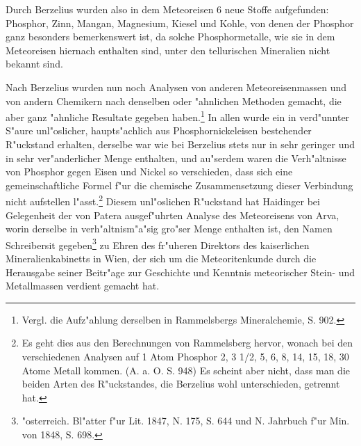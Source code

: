 \documentclass[a4paper, 11pt, oneside, german]{article}
\begin{document}
Durch Berzelius wurden also in dem Meteoreisen 6 neue Stoffe aufgefunden: Phosphor, Zinn, Mangan, Magnesium, Kiesel und Kohle, von denen der Phosphor ganz besonders bemerkenswert ist, da solche Phosphormetalle, wie sie in dem Meteoreisen hiernach enthalten sind, unter den tellurischen Mineralien nicht bekannt sind.

Nach Berzelius wurden nun noch Analysen von anderen Meteoreisenmassen und von andern Chemikern nach denselben oder "ahnlichen Methoden gemacht, die aber ganz "ahnliche Resultate gegeben haben.\footnote{Vergl. die Aufz"ahlung derselben in Rammelsbergs Mineralchemie, S. 902.} In allen wurde ein in verd"unnter S"aure unl"oslicher, haupts"achlich aus Phosphornickeleisen bestehender R"uckstand erhalten, derselbe war wie bei Berzelius stets nur in sehr geringer und in sehr ver"anderlicher Menge enthalten, und au"serdem waren die Verh"altnisse von Phosphor gegen Eisen und Nickel so verschieden, dass sich eine gemeinschaftliche Formel f"ur die chemische Zusammensetzung dieser Verbindung nicht aufstellen l"asst.\footnote{Es geht dies aus den Berechnungen von Rammelsberg hervor, wonach bei den verschiedenen Analysen auf 1 Atom Phosphor 2, 3 1/2, 5, 6, 8, 14, 15, 18, 30 Atome Metall kommen. (A. a. O. S. 948) Es scheint aber nicht, dass man die beiden Arten des R"uckstandes, die Berzelius wohl unterschieden, getrennt hat.} Diesem unl"oslichen R"uckstand hat Haidinger bei Gelegenheit der von Patera ausgef"uhrten Analyse des Meteoreisens von Arva, worin derselbe in verh"altnism"a"sig gro"ser Menge enthalten ist, den Namen Schreibersit gegeben\footnote{"osterreich. Bl"atter f"ur Lit. 1847, N. 175, S. 644 und N. Jahrbuch f"ur Min. von 1848, S. 698.} zu Ehren des fr"uheren Direktors des kaiserlichen Mineralienkabinetts in Wien, der sich um die Meteoritenkunde durch die Herausgabe seiner Beitr"age zur Geschichte und Kenntnis meteorischer Stein- und Metallmassen verdient gemacht hat.
\end{document}
